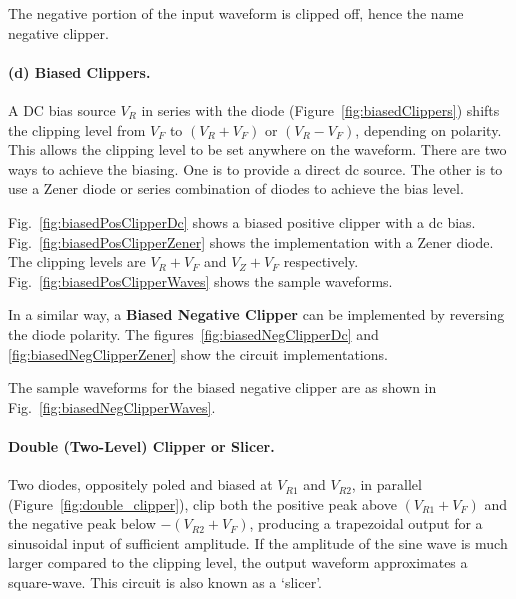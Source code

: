 The negative portion of the input waveform is clipped off, hence the name negative clipper.
\paragraph{(d) Biased Clippers.}
A DC bias source $V_R$ in series with the diode (Figure~\ref{fig:biasedClippers}) shifts the clipping level from $V_F$ to $(V_R + V_F)$ or $(V_R - V_F)$, depending on polarity. This allows the clipping level to be set anywhere on the waveform. There are two ways to achieve the biasing. One is to provide a direct dc source. The other is to use a Zener diode or series combination of diodes to achieve the bias level.

Fig.~\ref{fig:biasedPosClipperDc} shows a biased positive clipper with a dc bias. Fig.~\ref{fig:biasedPosClipperZener} shows the implementation with a Zener diode. The clipping levels are $V_R+V_F$ and $V_Z+V_F$ respectively. Fig.~\ref{fig:biasedPosClipperWaves} shows the sample waveforms. 

In a similar way, a \textbf{Biased Negative Clipper} can be implemented by reversing the diode polarity. The figures~\ref{fig:biasedNegClipperDc} and \ref{fig:biasedNegClipperZener} show the circuit implementations.

The sample waveforms for the biased negative clipper are as shown in Fig.~\ref{fig:biasedNegClipperWaves}.


\paragraph{Double (Two-Level) Clipper or Slicer.}
Two diodes, oppositely poled and biased at $V_{R1}$ and $V_{R2}$, in parallel (Figure~\ref{fig:double_clipper}), clip both the positive peak above $(V_{R1}+V_F)$ and the negative peak below $-(V_{R2}+V_F)$, producing a trapezoidal output for a sinusoidal input of sufficient amplitude. If the amplitude of the sine wave is much larger compared to the clipping level, the output waveform approximates a square-wave. This circuit is also known as a `slicer'. 

